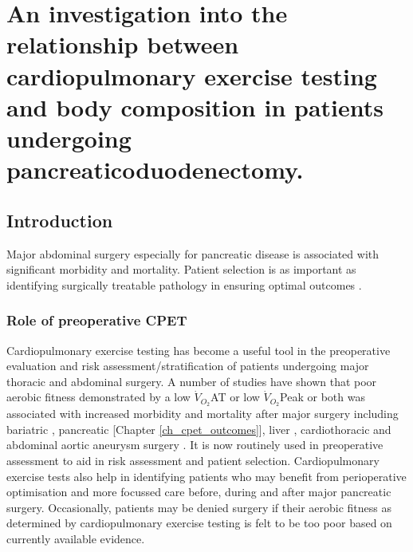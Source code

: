 
\chapter{An investigation into the relationship between cardiopulmonary exercise testing and body composition in patients undergoing pancreaticoduodenectomy.}
\label{ch_bodycomp}
\clearpage

\section{Introduction}
Major abdominal surgery especially for pancreatic disease is associated with significant morbidity and mortality. 
Patient selection is as important as identifying surgically treatable pathology in ensuring optimal outcomes \parencite{bilimoria_national_2007, sandroussi_sociodemographics_2010}.

\subsection{Role of preoperative CPET}
Cardiopulmonary exercise testing has become a useful tool in the preoperative evaluation and risk assessment/stratification of patients undergoing major thoracic and abdominal surgery. 
A number of studies have shown that poor aerobic fitness demonstrated by a low $\dot{V}_{O_2}$AT or low $\dot{V}_{O_2}$Peak or both was associated with increased morbidity and mortality after major surgery including bariatric \parencite{mccullough_cardiorespiratory_2006}, pancreatic \parencite{ausania_effects_2012}[Chapter \ref{ch_cpet_outcomes}], liver \parencite{epstein_aerobic_2004}, cardiothoracic \parencite{brunelli_risk_2010, campione_oxygen_2010,torchio_exercise_2010} and abdominal aortic aneurysm surgery \parencite{carlisle_mid-term_2007,thompson_cardiopulmonary_2011}. 
It is now routinely used in preoperative assessment to aid in risk assessment and patient selection.
Cardiopulmonary exercise tests also help in identifying patients who may benefit from perioperative optimisation and more focussed care before, during and after major pancreatic surgery.
Occasionally, patients may be denied surgery if their aerobic fitness as determined by cardiopulmonary exercise testing is felt to be too poor based on currently available evidence.

